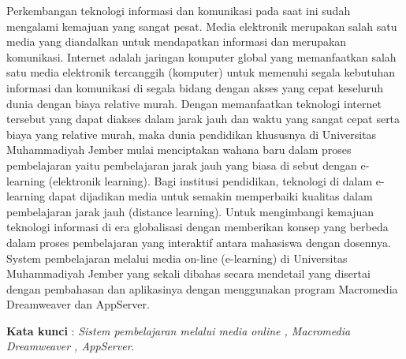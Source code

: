\documentclass{jtetiproposalskripsi}
\begin{document}
\cover

\approvalpage


\begin{abstractind}
Perkembangan teknologi informasi dan komunikasi pada saat ini sudah mengalami kemajuan yang sangat pesat. Media elektronik merupakan salah satu media yang diandalkan untuk mendapatkan informasi dan merupakan komunikasi. Internet adalah jaringan komputer global yang memanfaatkan salah satu media elektronik tercanggih (komputer) untuk memenuhi segala kebutuhan informasi dan komunikasi di segala bidang dengan akses yang cepat keseluruh dunia dengan biaya relative murah. Dengan memanfaatkan teknologi internet tersebut yang dapat diakses dalam jarak jauh dan waktu yang sangat cepat serta biaya yang relative murah, maka dunia pendidikan khususnya di Universitas Muhammadiyah Jember mulai menciptakan wahana baru dalam proses pembelajaran yaitu pembelajaran jarak jauh yang biasa di sebut dengan e-learning (elektronik  learning). Bagi institusi pendidikan, teknologi di dalam e-learning dapat dijadikan media untuk semakin memperbaiki kualitas dalam pembelajaran jarak jauh (distance learning). Untuk mengimbangi kemajuan teknologi informasi di era globalisasi dengan memberikan konsep yang berbeda dalam proses pembelajaran yang interaktif antara mahasiswa dengan dosennya. System pembelajaran melalui media on-line (e-learning) di Universitas Muhammadiyah Jember yang sekali dibahas secara mendetail yang disertai dengan pembahasan dan aplikasinya dengan menggunakan program Macromedia Dreamweaver dan AppServer.

\bigskip
\textbf{Kata kunci} : \emph{Sistem pembelajaran melalui media online , Macromedia Dreamweaver , AppServer}.
\end{abstractind}

\tableofcontents
{}
\clearpage{}\setcounter{page}{1}

\end{document}
